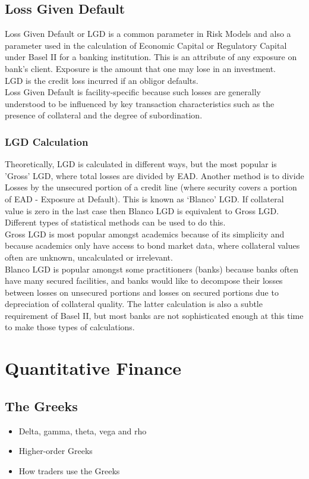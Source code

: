 \documentclass[12pt, a4paper]{report}
\begin{document}
\section{Loss Given Default}
Loss Given Default or LGD is a common parameter in Risk Models and
also a parameter used in the calculation of Economic Capital or
Regulatory Capital under Basel II for a banking institution. This
is an attribute of any exposure on bank's client. Exposure is the
amount that one may lose in an investment.
\\
LGD is the credit loss incurred if an obligor defaults. \\ Loss
Given Default is facility-specific because such losses are
generally understood to be influenced by key transaction
characteristics such as the presence of collateral and the degree
of subordination.

\subsection{LGD Calculation}
Theoretically, LGD is calculated in different ways, but the most
popular is 'Gross' LGD, where total losses are divided by EAD.
Another method is to divide Losses by the unsecured portion of a
credit line (where security covers a portion of EAD - Exposure at
Default). This is known as `Blanco' LGD. If collateral value is
zero in the last case then Blanco LGD is equivalent to Gross LGD.
Different types of statistical methods can be used to do this.
\\Gross LGD is most popular amongst academics because of its
simplicity and because academics only have access to bond market
data, where collateral values often are unknown, uncalculated or
irrelevant. \\Blanco LGD is popular amongst some practitioners
(banks) because banks often have many secured facilities, and
banks would like to decompose their losses between losses on
unsecured portions and losses on secured portions due to
depreciation of collateral quality. The latter calculation is also
a subtle requirement of Basel II, but most banks are not
sophisticated enough at this time to make those types of
calculations.

\newpage
\chapter{Quantitative Finance}

\section{The Greeks}
\begin{itemize} \item Delta, gamma, theta, vega and rho \item
Higher-order Greeks \item How traders use the Greeks \end{itemize}
\end{document}
